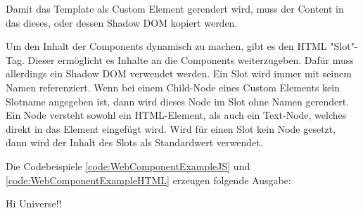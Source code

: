 
Damit das Template als Custom Element gerendert wird, muss der Content in das dieses, oder dessen Shadow DOM kopiert werden.


Um den Inhalt der Components dynamisch zu machen, gibt es den HTML "Slot"-Tag. 
Dieser ermöglicht es Inhalte an die Components weiterzugeben. 
Dafür muss allerdings ein Shadow DOM verwendet werden. 
Ein Slot wird immer mit seinem Namen referenziert. 
Wenn bei einem Child-Node eines Custom Elements kein Slotname angegeben ist, dann wird dieses Node im Slot ohne Namen gerendert. 
Ein Node versteht sowohl ein HTML-Element, als auch ein Text-Node, welches direkt in das Element eingefügt wird. 
Wird für einen Slot kein Node gesetzt, dann wird der Inhalt des Slots als Standardwert verwendet. 
\cite{MDNSlots}

\pagebreak
{}




Die Codebeispiele \ref{code:WebComponentExampleJS} und \ref{code:WebComponentExampleHTML} erzeugen folgende Ausgabe:

{\ttfamily Hi Universe!!}